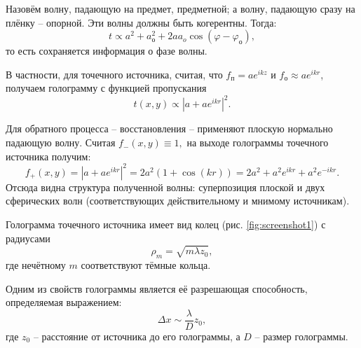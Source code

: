 Назовём волну, падающую на предмет, предметной; а волну, падающую сразу на плёнку -- опорной. Эти волны должны быть когерентны. Тогда:
\begin{equation*}\label{key}
	t \propto a^2+a_о^2+2 a a_o \cos (\varphi - \varphi_о),
\end{equation*}
то есть сохраняется информация о фазе волны.

В частности, для точечного источника, считая, что $ f_п = a e^{i k z}  $ и $ f_о \approx a e^{i k r} $, получаем голограмму  с функцией пропускания
\begin{equation*}\label{key}
	t(x, y) \propto \left| a+ a e^{i k r}\right|^2.
\end{equation*}

Для обратного процесса -- восстановления -- применяют плоскую нормально падающую волну. Считая $ f_- (x, y) \equiv 1, $ на выходе голограммы точечного источника получим:
\begin{equation*}\label{key}
	f_+ (x, y) = \left| a+ a e^{i k r}\right|^2 = 2 a^2 (1+\cos (k r)) = 2 a^2 + a^2 e^{i k r} +a^2 e^{- i k r}.
\end{equation*}
Отсюда видна структура полученной волны: суперпозиция плоской и двух сферических волн (соответствующих действительному и мнимому источникам).

Голограмма точечного источника имеет вид колец (рис. \ref{fig:screenshot1}) с радиусами
\begin{equation*}\label{key}
	\rho_m = \sqrt{m \lambda z_0},
\end{equation*}
где нечётному $ m $ соответствуют тёмные кольца.

Одним из свойств голограммы является её разрешающая способность, определяемая выражением:
\begin{equation*}\label{key}
	\Delta x \sim \frac{\lambda}{D} z_0,
\end{equation*}
где $ z_0 $ -- расстояние от источника до его голограммы, а $ D $ -- размер голограммы.


